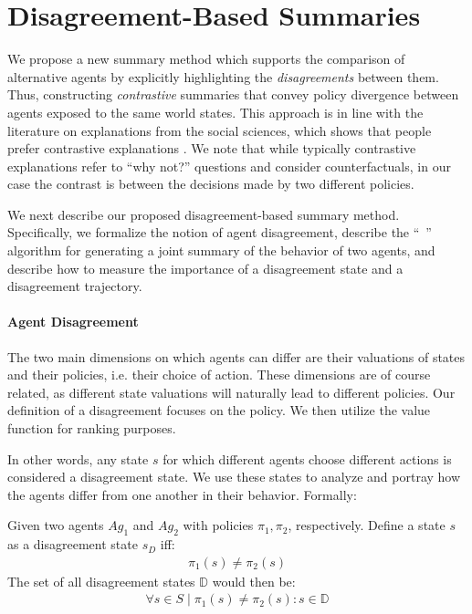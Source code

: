 \section{Disagreement-Based Summaries}
We propose a new summary method which supports the comparison of alternative
agents by explicitly highlighting the \emph{disagreements} between them. Thus,
constructing \emph{contrastive} summaries that convey policy divergence between
agents exposed to the same world states. This approach is in line with the
literature on explanations from the social sciences, which shows that people
prefer contrastive explanations \cite{miller2018explanation}. We note that while
typically contrastive explanations refer to ``why not?'' questions and consider
counterfactuals, in our case the contrast is between the decisions made by two
different policies.

We next describe our proposed disagreement-based summary method. Specifically,
we formalize the notion of agent disagreement,
describe the ``\disalg~'' algorithm for generating a joint summary of the
behavior of two agents, and describe how to measure the importance of a disagreement state and a disagreement trajectory.


\paragraph{Agent Disagreement}
The two main dimensions on which agents can differ are their valuations of
states and their policies, i.e. their choice of action. These dimensions are of
course related, as different state valuations will naturally lead to different
policies. Our definition of a disagreement focuses on the policy. We then utilize the value function for ranking purposes.

In other words, any state $s$ for which different agents choose different
actions is considered a disagreement state. We use these states to
analyze and portray how the agents differ from one another in their behavior.
Formally:
\begin{definition}
    Given two agents ${Ag}_{1}$ and ${Ag}_{2}$ with policies  $\pi_1, \pi_2$,
    respectively. Define a state $s$ as a disagreement state $s_D$ iff:
    \begin{align}
        \pi_1(s) \neq \pi_2(s)
    \end{align}
    The set of all disagreement states $\mathbb{D}$ would then be:
    \begin{align}
        \forall s \in S \; | \; \pi_1(s) \neq \pi_2(s) : s \in \mathbb{D}
    \end{align}

\end{definition} 


